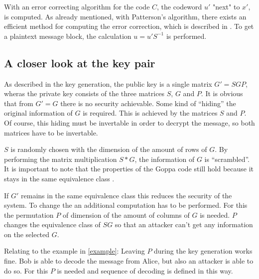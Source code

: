 With an error correcting algorithm for the code $C$, the codeword $u'$ "next" to $x'$, is computed. As already mentioned, with Patterson's algorithm, there exists an efficient method for computing the error correction, which is described in \cite{patterson1975algebraic}.
To get a plaintext message block, the calculation $u = u'S^{-1}$ is performed\cite{mceliece1978public}.

\subsection*{A closer look at the key pair}
As described in the key generation, the public key is a single matrix $G' = SGP$, wheras the private key consists of the  three matrices $S$, $G$ and $P$. 
It is obvious that from $G' = G$ there is no security achievable. Some kind of ``hiding'' the original information of $G$ is required. This is achieved by the matrices $S$ and $P$. Of course, this hiding must be invertable in order to decrypt the message, so both matrices have to be invertable. 

$S$ is randomly chosen with the dimension of the amount of rows of $G$. By performing the matrix multiplication $S * G$, the information of $G$ is ``scrambled''. It is important to note that the properties of the Goppa code still hold because it stays in the same equivalence class \cite{ryanequivalent}. 

If $G'$ remains in the same equivalence class this reduces the security of the system. To change the an additional computation has to be performed. For this the permutation $P$ of dimension of the amount of columns of $G$ is needed. $P$ changes the equivalence class of $SG$ so that an attacker can't get any information on the selected $G$. 

Relating to the example in \autoref{example}: Leaving $P$ during the key generation works fine. Bob is able to decode the message from Alice, but also an attacker is able to do so. For this $P$ is needed and sequence of decoding is defined in this way. 

